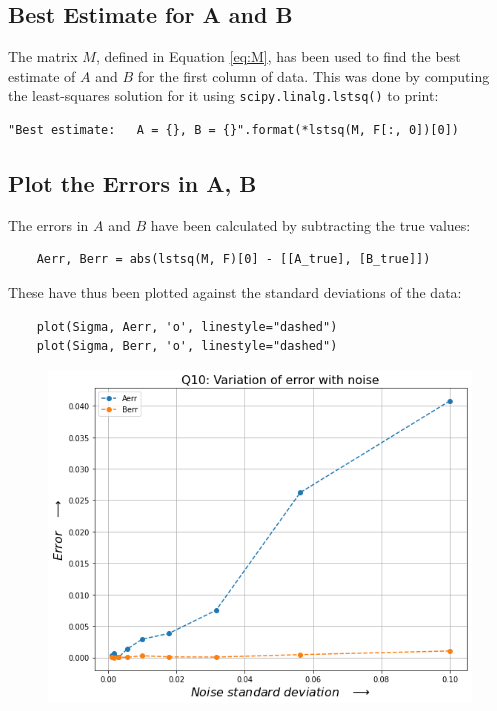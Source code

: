\documentclass[12pt, a4paper]{article}
\begin{document}
\subsection{Best Estimate for A and B}
The matrix $M$, defined in Equation \ref{eq:M}, has been used to find the best estimate
of $A$ and $B$ for the first column of data. This was done by computing the
least-squares solution for it using \texttt{scipy.linalg.lstsq()} to print:
\begin{verbatim}
"Best estimate:   A = {}, B = {}".format(*lstsq(M, F[:, 0])[0])
\end{verbatim}


\subsection{Plot the Errors in A, B}
The errors in $A$ and $B$ have been calculated by subtracting the true values:
\begin{verbatim}
    Aerr, Berr = abs(lstsq(M, F)[0] - [[A_true], [B_true]])
\end{verbatim}
These have thus been plotted against the standard deviations of the data:
\begin{verbatim}
    plot(Sigma, Aerr, 'o', linestyle="dashed")
    plot(Sigma, Berr, 'o', linestyle="dashed")
\end{verbatim}
\begin{figure}[H]
    \centering
    \includegraphics[scale=0.6]{Q10.png}
\end{figure}
\pagebreak
\end{document}
